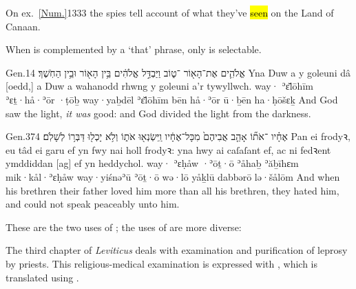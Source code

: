 \begin{paper}
	{\click} On ex.~\vref{Num.}{13}{33}{} the spies tell account of what they’ve \hl{seen} on the Land of Canaan.
\end{paper}




\begin{paper}
	{\click} When  is complemented by a  ‘that’ phrase, only  is selectable.
\end{paper}

\begin{example}{Gen.}{1}{4}{}{}
	\quoling
	{ אֱלֹהִ֛ים אֶת־הָא֖וֹר ־ט֑וֹב וַיַּבְדֵּ֣ל אֱלֹהִ֔ים בֵּ֥ין הָא֖וֹר וּבֵ֥ין הַחֹֽשֶׁךְ׃}
	{Yna Duw a  y goleuni  dâ [oedd,] a Duw a wahanodd rhwng y goleuni a’r tywyllwch.}
	{way· ʾɛ̆lōhīm ʾɛṯ·hå·ʾōr ·ṭōḇ way·yaḇdēl ʾɛ̆lōhīm bēn hå·ʾōr ū·ḇēn ha·ḥōšɛḵ}
	{And God saw the light,  \emph{it was} good: and God divided the light from the darkness.}
\end{example}

\begin{example}{Gen.}{37}{4}{}{}
	\quoling
	{ אֶחָ֗יו ־אֹת֞וֹ אָהַ֤ב אֲבִיהֶם֙ מִכָּל־אֶחָ֔יו וַֽיִּשְׂנְא֖וּ אֹת֑וֹ וְלֹ֥א יָכְל֖וּ דַּבְּר֥וֹ לְשָׁלֹֽם׃}
	{Pan  ei frodyꝛ,  eu tâd  ei garu ef yn fwy nai holl frodyꝛ: yna hwy ai caſaſant ef, ac ni fedꝛent ymddiddan [ag] ef yn heddychol.}
	{way· ʾɛḥåw ·ʾōṯ·ō ʾåhaḇ ʾăḇīhɛm mik·kål·ʾɛḥåw way·yiśnəʾū ʾōṯ·ō wə·lō yåḵlū dabbərō lə·šålōm}
	{And when his brethren   their father loved him more than all his brethren, they hated him, and could not speak peaceably unto him.}
\end{example}

\begin{paper}
	{\click}{\click} These are the two uses of ; the uses of  are more diverse:
\end{paper}




\begin{paper}
	The third chapter of \emph{Leviticus} deals with examination and purification of leprosy by priests. This religious-medical examination is expressed with , which is translated using .
\end{paper}

